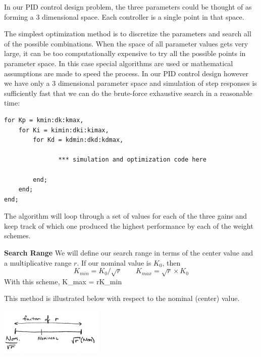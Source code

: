
In our PID control design problem, the three parameters could be thought of as forming a 3 dimensional space.  Each controller is a single point in that space.

The simplest optimization method is to discretize the parameters and search all of the possible combinations.
When the space of all parameter values gets very large, it can be too computationally expensive to try all the possible points in parameter space.  In this case special algorithms are used or mathematical assumptions are made to speed the process.
In our PID control design however we have only a 3 dimensional parameter space and simulation of step responses is sufficiently fast that we can do the brute-force exhaustive search in a reasonable time:


\begin{verbatim}
for Kp = kmin:dk:kmax,
    for Ki = kimin:dki:kimax,
        for Kd = kdmin:dkd:kdmax,

               *** simulation and optimization code here

        end;
    end;
end;
\end{verbatim}






The algorithm will loop through a set of values for each of the three gains and keep track of which one produced the highest performance by each of the weight schemes.

{\bf Search Range}  We will define our search range in terms of the center value and a multiplicative range $r$. If our nominal value is $K_0$, then
\[
K_{min} = K_0/\sqrt{r} \qquad  K_{max} = \sqrt{r}\times K_0
\]
  With this scheme,
\bq\label{ranger}
K_{max} = rK_{min}
\eq


This method is illustrated below with respect to the nominal (center) value.	%
\begin{center}
\includegraphics[width=50mm]{figs11/00615a.png}
\end{center}

